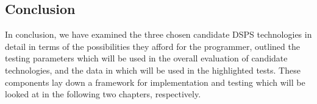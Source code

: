 

\subsection{Conclusion} %
\label{sub:conclusion}

In conclusion, we have examined the three chosen candidate DSPS technologies in detail in terms of the possibilities they
afford for the programmer, outlined the testing parameters which will be used in the overall evaluation of candidate
technologies, and the data in which will be used in the highlighted tests. These components lay down a framework for
implementation and testing which will be looked at in the following two chapters, respectively.



